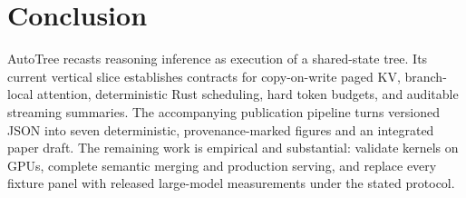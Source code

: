 \section{Conclusion}

AutoTree recasts reasoning inference as execution of a shared-state tree.  Its
current vertical slice establishes contracts for copy-on-write paged KV,
branch-local attention, deterministic Rust scheduling, hard token budgets, and
auditable streaming summaries.  The accompanying publication pipeline turns
versioned JSON into seven deterministic, provenance-marked figures and an
integrated paper draft.  The remaining work is empirical and substantial:
validate kernels on GPUs, complete semantic merging and production serving, and
replace every fixture panel with released large-model measurements under the
stated protocol.
